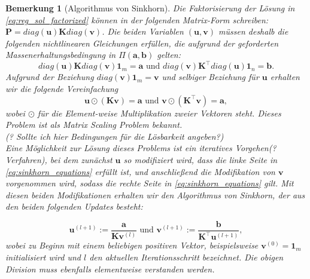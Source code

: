 \documentclass[11pt,a4paper]{article}
\newtheorem{remark}[theorem]{Bemerkung}
\numberwithin{equation}{section}
\begin{document}
	
	\begin{remark}[Algorithmus von Sinkhorn]
		Die Faktorisierung der Lösung in \autoref{eq:reg_sol_factorized} können in der folgenden Matrix-Form schreiben: $\boldsymbol{P} = diag(\boldsymbol{u}) \boldsymbol{K} diag(\boldsymbol{v})$. Die beiden Variablen $(\boldsymbol{u}, \boldsymbol{v})$ müssen deshalb die folgenden nichtlinearen Gleichungen erfüllen, die aufgrund der geforderten Massenerhaltungsbedingung in $\Pi (\boldsymbol{a},\boldsymbol{b})$ gelten:
		\begin{equation}
		diag(\boldsymbol{u}) \boldsymbol{K} diag(\boldsymbol{v})\boldsymbol{1}_m = \boldsymbol{a} \text{ und }
		diag(\boldsymbol{v}) \boldsymbol{K}^\top diag(\boldsymbol{u})\boldsymbol{1}_n = \boldsymbol{b}.
		\end{equation}
		Aufgrund der Beziehung $diag(\boldsymbol{v})\boldsymbol{1}_m =  \boldsymbol{v}$ und selbiger Beziehung für $\boldsymbol{u}$ erhalten wir die folgende Vereinfachung
		\begin{equation}
		\boldsymbol{u} \odot (\boldsymbol{K}\boldsymbol{v}) = \boldsymbol{a} \text{ und }
		\boldsymbol{v} \odot (\boldsymbol{K}^\top \boldsymbol{v}) = \boldsymbol{a}, \label{eq:sinkhorn_equations}
		\end{equation}  
		wobei $\odot$ für die Element-weise Multiplikation zweier Vektoren steht. Dieses Problem ist als \textit{Matrix Scaling Problem} \cite{matrix_scaling} bekannt.\\
		(? Sollte ich hier Bedingungen für die Lösbarkeit angeben?) \\
		Eine Möglichkeit zur Lösung dieses Problems ist ein iteratives Vorgehen(?Verfahren), bei dem zunächst $\boldsymbol{u}$ so modifiziert wird, dass die linke Seite in \autoref{eq:sinkhorn_equations} erfüllt ist, und anschließend die Modifikation von $\boldsymbol{v}$ vorgenommen wird, sodass die rechte Seite in \autoref{eq:sinkhorn_equations} gilt. Mit diesen beiden Modifikationen erhalten wir den Algorithmus von Sinkhorn, der aus den beiden folgenden Updates besteht:
		
		\begin{equation}
		\boldsymbol{u}^{(l+1)}:= \frac{\boldsymbol{a}}{\boldsymbol{K}\boldsymbol{v}^{(l)}} \text{ und }
		\boldsymbol{v}^{(l+1)}:= \frac{\boldsymbol{b}}{\boldsymbol{K}^\top \boldsymbol{u}^{(l+1)}},
		\end{equation} 
		wobei zu Beginn mit einem beliebigen positiven Vektor, beispielsweise $\boldsymbol{v}^{(0)} = \boldsymbol{1}_m$ initialisiert wird und $l$ den aktuellen Iterationsschritt bezeichnet. Die obigen Division muss ebenfalls elementweise verstanden werden.
	\end{remark}
	
\end{document}
